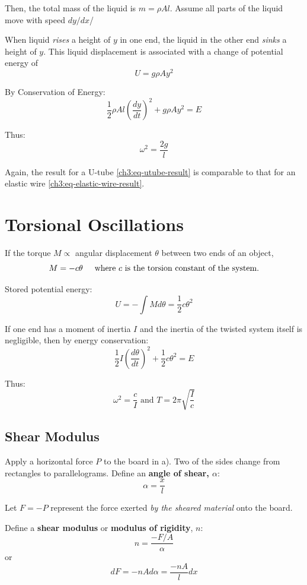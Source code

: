 \documentclass[11pt,letterpaper,titlepage,oneside]{book}
\newcommand{\htab}{\hspace{0.5cm}}
\newcommand{\where}{\htab\text{where }}
\begin{document}
Then, the total mass of the liquid is $m=\rho Al$. Assume all parts of the liquid move with speed $dy/dx$/

When liquid \textit{rises} a height of $y$ in one end, the liquid in the other end \textit{sinks} a height of $y$. This liquid displacement is associated with a change of potential energy of
\[ U = g\rho Ay^2 \]

By Conservation of Energy:
\[ \frac{1}{2}\rho Al \left( \frac{dy}{dt} \right)^2 + g\rho Ay^2 = E  \] 

Thus:
\begin{equation}
\omega^2 = \frac{2g}{l} \label{ch3:eq-utube-result}
\end{equation}

Again, the result for a U-tube \eqref{ch3:eq-utube-result} is comparable to that for an elastic wire \eqref{ch3:eq-elastic-wire-result}.

\section{Torsional Oscillations} \label{ch3:sec-torsional}
If the torque $M \propto$ angular displacement $\theta$ between two ends of an object,
\[ M=-c\theta \where\text{$c$ is the torsion constant of the system.} \]

Stored potential energy: \[ U= -\int M d\theta = \frac{1}{2} c\theta^2 \]

If one end has a moment of inertia $I$ and the inertia of the twisted system itself is negligible, then by energy conservation:
\[ \frac{1}{2}I\left( \frac{d\theta}{dt}\right)^2 + \frac{1}{2} c\theta^2 = E \]

Thus:
\begin{equation}
\omega^2 = \frac{c}{I} \text{ and } T = 2\pi\sqrt{\frac{I}{c}} \label{torsionalT}
\end{equation}

\subsection{Shear Modulus}
Apply a horizontal force $P$ to the board in a). Two of the sides change from rectangles to parallelograms. Define an \textbf{angle of shear, $\alpha$}:
\[ \alpha = \frac{x}{l} \]

Let $F=-P$ represent the force exerted \textit{by the sheared material} onto the board.

Define a \textbf{shear modulus} or \textbf{modulus of rigidity}, $n$:
\[ n = \frac{-F/A}{\alpha} \]
or
\begin{equation} \boxed{dF = -nA d\alpha = \frac{-nA}{l}dx} \label{shear_dF} \end{equation}
\end{document}

